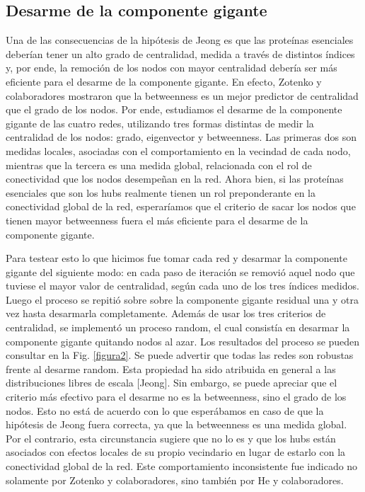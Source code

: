 \documentclass[%
 reprint,
 amsmath,amssymb,
 aps,
]{revtex4-1}
\begin{document}
\subsection{Desarme de la componente gigante}

Una de las consecuencias de la hip\'otesis de Jeong es que las prote\'inas esenciales deber\'ian tener un alto grado de centralidad, medida a trav\'es de distintos \'indices y, por ende, la remoci\'on de los nodos con mayor centralidad deber\'ia ser m\'as eficiente para el desarme de la componente gigante. En efecto, Zotenko y colaboradores mostraron que la betweenness es un mejor predictor de centralidad que el grado de los nodos. Por ende, estudiamos el desarme de la componente gigante de las cuatro redes, utilizando tres formas distintas de medir la centralidad de los nodos: grado, eigenvector y betweenness. Las primeras dos son medidas locales, asociadas con el comportamiento en la vecindad de cada nodo, mientras que la tercera es una medida global, relacionada con el rol de conectividad que los nodos desempe\~nan en la red. Ahora bien, si las prote\'inas esenciales que son los hubs realmente tienen un rol preponderante en la conectividad global de la red, esperar\'iamos que el criterio de sacar los nodos que tienen mayor betweenness fuera el m\'as eficiente para el desarme de la componente gigante.

Para testear esto lo que hicimos fue tomar cada red y desarmar la componente gigante del siguiente modo: en cada paso de iteraci\'on se removi\'o aquel nodo que tuviese el mayor valor de centralidad, seg\'un cada uno de los tres \'indices medidos. Luego el proceso se repiti\'o sobre sobre la componente gigante residual una y otra vez hasta desarmarla completamente. Adem\'as de usar los tres criterios de centralidad, se implement\'o un proceso random, el cual consist\'ia en desarmar la componente gigante quitando nodos al azar. Los resultados del proceso se pueden consultar en la Fig. \ref{figura2}. Se puede advertir que todas las redes son robustas frente al desarme random. Esta propiedad ha sido atribuida en general a las distribuciones libres de escala [Jeong]. Sin embargo, se puede apreciar que el criterio m\'as efectivo para el desarme no es la betweenness, sino el grado de los nodos. Esto no est\'a de acuerdo con lo que esper\'abamos en caso de que la hip\'otesis de Jeong fuera correcta, ya que la betweenness es una medida global. Por el contrario, esta circunstancia sugiere que no lo es y que los hubs est\'an asociados con efectos locales de su propio vecindario en lugar de estarlo con la conectividad global de la red. Este comportamiento inconsistente fue indicado no solamente por Zotenko y colaboradores, sino tambi\'en por He y colaboradores.
\end{document}
